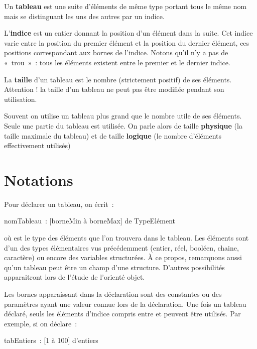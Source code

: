 	Un \textbf{tableau} est une suite d’éléments de même type 
	portant tous le même nom mais se distinguant 
	les uns des autres par un indice.

	L’\textbf{indice} est un entier 
	donnant la position d’un élément dans la suite. 
	Cet indice varie entre la position du premier élément 
	et la position du dernier élément, 
	ces positions correspondant aux bornes de l’indice.
	Notons qu'il n'y a pas de «~trou~»~: 
	tous les éléments existent entre le premier et le dernier indice.

	La \textbf{taille} d’un tableau 
	est le nombre (strictement positif) de ses éléments.
	Attention ! la taille d’un tableau ne peut pas être modifiée pendant
	son utilisation.

	Souvent on utilise un tableau plus grand que
	le nombre utile de ses éléments. 
	Seule une partie du tableau est utilisée. 
	On parle alors de taille \textbf{physique}
	(la taille maximale du tableau) 
	et de taille \textbf{logique}
	(le nombre d'éléments effectivement utilisés)

\section{Notations}

	Pour déclarer un tableau, on écrit~:

	\begin{Pseudocode}
	\Decl nomTableau~:  [borneMin à borneMax] de TypeElément
	\end{Pseudocode}
	
	où  est le type des éléments que l’on
	trouvera dans le tableau. Les éléments sont d’un des types élémentaires
	vus précédemment (entier, réel, booléen, chaine, caractère) ou encore
	des variables structurées. À ce propos, remarquons aussi
	qu'un tableau peut être un champ d'une structure. 
	D'autres possibilités apparaitront lors de l'étude de
	l'orienté objet.

	Les bornes apparaissant dans la déclaration sont des constantes ou des
	paramètres ayant une valeur connue lors de la déclaration. Une fois un
	tableau déclaré, seuls les éléments d’indice compris entre
	 et  peuvent
	être utilisés. Par exemple, si on déclare~:

	\begin{Pseudocode}
	\Decl tabEntiers~:  [1 à 100] d’entiers
	\end{Pseudocode}
	
